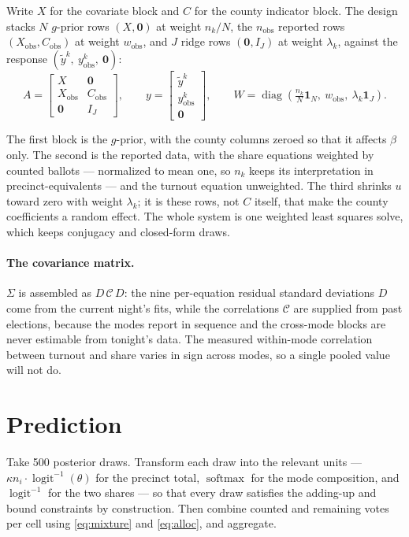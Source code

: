 \documentclass[11pt]{article}
\newcommand{\logit}{\operatorname{logit}}
\newcommand{\softmax}{\operatorname{softmax}}
\begin{document}
Write $X$ for the covariate block and $C$ for the county indicator block. The design
stacks $N$ $g$-prior rows $(X, \mathbf{0})$ at weight $n_k / N$, the $n_{\text{obs}}$
reported rows $(X_{\text{obs}}, C_{\text{obs}})$ at weight $w_{\text{obs}}$, and $J$
ridge rows $(\mathbf{0}, I_J)$ at weight $\lambda_k$, against the response
$(\tilde{y}^{k},\ y^{k}_{\text{obs}},\ \mathbf{0})$:
\begin{equation}
  A = \begin{bmatrix}
        X & \mathbf{0} \\
        X_{\text{obs}} & C_{\text{obs}} \\
        \mathbf{0} & I_J
      \end{bmatrix},
  \qquad
  y = \begin{bmatrix} \tilde{y}^{k} \\ y^{k}_{\text{obs}} \\ \mathbf{0} \end{bmatrix},
  \qquad
  W = \operatorname{diag}\!\left(\tfrac{n_k}{N}\mathbf{1}_N,\ w_{\text{obs}},\
      \lambda_k \mathbf{1}_J\right).
  \label{eq:design}
\end{equation}

The first block is the $g$-prior, with the county columns zeroed so that it affects
$\beta$ only. The second is the reported data, with the share equations weighted by
counted ballots --- normalized to mean one, so $n_k$ keeps its interpretation in
precinct-equivalents --- and the turnout equation unweighted. The third shrinks $u$
toward zero with weight $\lambda_k$; it is these rows, not $C$ itself, that make the
county coefficients a random effect. The whole system is one weighted least squares
solve, which keeps conjugacy and closed-form draws.

\paragraph{The covariance matrix.}
$\Sigma$ is assembled as $D\,\mathcal{C}\,D$: the nine per-equation residual standard
deviations $D$ come from the current night's fits, while the correlations $\mathcal{C}$
are supplied from past elections, because the modes report in sequence and the cross-mode
blocks are never estimable from tonight's data. The measured within-mode correlation
between turnout and share varies in sign across modes, so a single pooled value will not
do.

\section{Prediction}

Take 500 posterior draws. Transform each draw into the relevant units ---
$\kappa n_i \cdot \logit^{-1}(\theta)$ for the precinct total, $\softmax$ for the mode
composition, and $\logit^{-1}$ for the two shares --- so that every draw satisfies the
adding-up and bound constraints by construction. Then combine counted and remaining votes
per cell using \eqref{eq:mixture} and \eqref{eq:alloc}, and aggregate.
\end{document}
